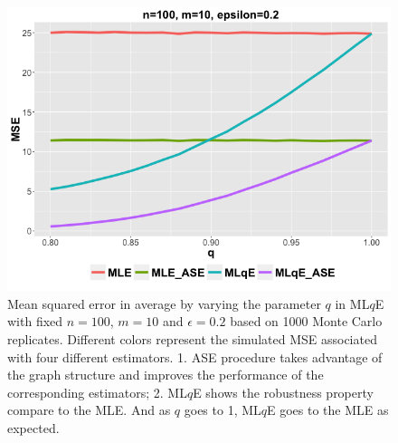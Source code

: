 \documentclass[a4paper]{article}
\begin{document}
\begin{figure}[!htb]
\centering
\includegraphics[width=1\textwidth]{q.png}
\caption{Mean squared error in average by varying the parameter $q$ in ML$q$E with fixed $n = 100$, $m = 10$ and $\epsilon = 0.2$ based on 1000 Monte Carlo replicates. Different colors represent the simulated MSE associated with four different estimators.
1. ASE procedure takes advantage of the graph structure and improves the performance of the corresponding estimators;
2. ML$q$E shows the robustness property compare to the MLE. And as $q$ goes to 1, ML$q$E goes to the MLE as expected.}
\label{fig:q}
\end{figure}

  
\end{document}
